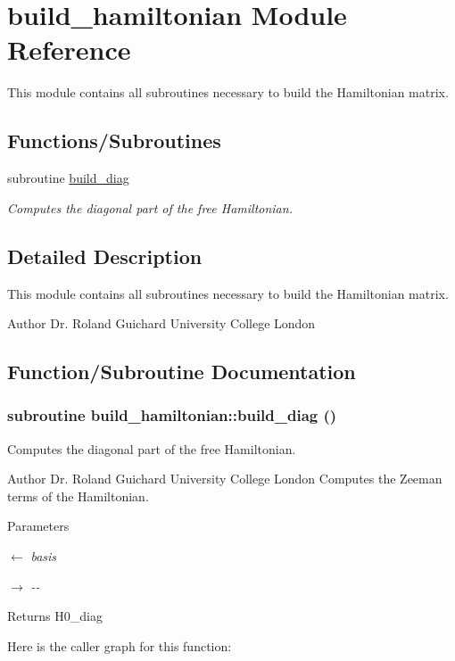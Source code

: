 \hypertarget{namespacebuild__hamiltonian}{
\section{build\_\-hamiltonian Module Reference}
\label{namespacebuild__hamiltonian}
}


This module contains all subroutines necessary to build the Hamiltonian matrix.  
\subsection*{Functions/Subroutines}
\begin{DoxyCompactItemize}
\item 
subroutine \hyperlink{namespacebuild__hamiltonian_ab5ac348f3684c47ce811a87c9c33acf7}{build\_\-diag}
\begin{DoxyCompactList}\small\item\em Computes the diagonal part of the free Hamiltonian. \item\end{DoxyCompactList}\end{DoxyCompactItemize}


\subsection{Detailed Description}
This module contains all subroutines necessary to build the Hamiltonian matrix. \begin{DoxyAuthor}{Author}
Dr. Roland Guichard University College London 
\end{DoxyAuthor}


\subsection{Function/Subroutine Documentation}
\hypertarget{namespacebuild__hamiltonian_ab5ac348f3684c47ce811a87c9c33acf7}{
\subsubsection[{build\_\-diag}]{\setlength{\rightskip}{0pt plus 5cm}subroutine build\_\-hamiltonian::build\_\-diag ()}}
\label{namespacebuild__hamiltonian_ab5ac348f3684c47ce811a87c9c33acf7}


Computes the diagonal part of the free Hamiltonian. \begin{DoxyAuthor}{Author}
Dr. Roland Guichard University College London Computes the Zeeman terms of the Hamiltonian.
\end{DoxyAuthor}

\begin{DoxyParams}{Parameters}
\item[\mbox{$\leftarrow$} {\em basis}]\item[\mbox{$\rightarrow$} {\em -\/-\/}]\end{DoxyParams}
\begin{DoxyReturn}{Returns}
H0\_\-diag 
\end{DoxyReturn}


Here is the caller graph for this function:
